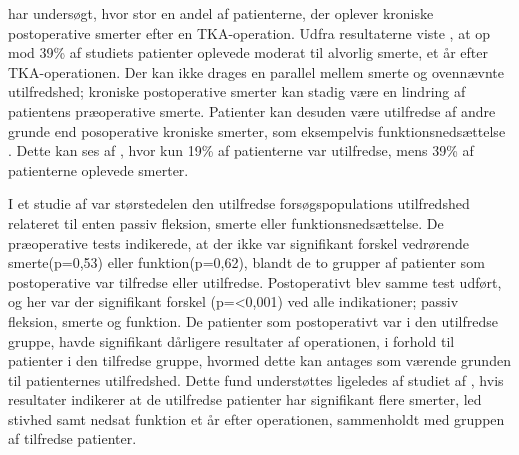 
 har undersøgt, hvor stor en andel af patienterne, der oplever kroniske postoperative smerter efter en TKA-operation. Udfra resultaterne viste , at op mod 39\% af studiets patienter oplevede moderat til alvorlig smerte, et år efter TKA-operationen. Der kan ikke drages en parallel mellem smerte og ovennævnte utilfredshed; kroniske postoperative smerter kan stadig være en lindring af patientens præoperative smerte. Patienter kan desuden være utilfredse af andre grunde end posoperative kroniske smerter, som eksempelvis funktionsnedsættelse \citep{Jacobs2014}. Dette kan ses af , hvor kun 19\% af patienterne var utilfredse, mens 39\% af patienterne oplevede smerter.\citep{Sakellariou2016} 

I et studie af  var størstedelen den utilfredse forsøgspopulations utilfredshed relateret til enten passiv fleksion, smerte eller funktionsnedsættelse. De præoperative tests indikerede, at der ikke var signifikant forskel vedrørende smerte(p=0,53) eller funktion(p=0,62), blandt de to grupper af patienter som postoperative var tilfredse eller utilfredse. Postoperativt blev samme test udført, og her var der signifikant forskel (p=<0,001) ved alle indikationer; passiv fleksion, smerte og funktion. 
De patienter som postoperativt var i den utilfredse gruppe, havde signifikant dårligere resultater af operationen, i forhold til patienter i den tilfredse gruppe, hvormed dette kan antages som værende grunden til patienternes utilfredshed. \citep{Jacobs2014} 
Dette fund understøttes ligeledes af studiet af \cite{Bourne2010}, hvis resultater indikerer at de utilfredse patienter har signifikant flere smerter, led stivhed samt nedsat funktion et år efter operationen, sammenholdt med gruppen af tilfredse patienter. \citep{Bourne2010}


